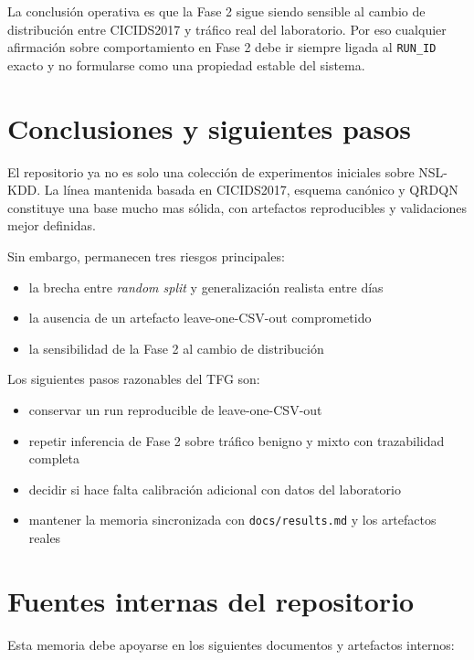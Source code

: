 \documentclass[12pt,a4paper]{report}
\begin{document}
La conclusión operativa es que la Fase 2 sigue siendo sensible al cambio de
distribución entre CICIDS2017 y tráfico real del laboratorio. Por eso cualquier
afirmación sobre comportamiento en Fase 2 debe ir siempre ligada al \texttt{RUN\_ID}
exacto y no formularse como una propiedad estable del sistema.

\chapter{Conclusiones y siguientes pasos}

El repositorio ya no es solo una colección de experimentos iniciales sobre NSL-KDD.
La línea mantenida basada en CICIDS2017, esquema canónico y QRDQN constituye una
base mucho mas sólida, con artefactos reproducibles y validaciones mejor definidas.

Sin embargo, permanecen tres riesgos principales:

\begin{itemize}
    \item la brecha entre \emph{random split} y generalización realista entre días
    \item la ausencia de un artefacto leave-one-CSV-out comprometido
    \item la sensibilidad de la Fase 2 al cambio de distribución
\end{itemize}

Los siguientes pasos razonables del TFG son:

\begin{itemize}
    \item conservar un run reproducible de leave-one-CSV-out
    \item repetir inferencia de Fase 2 sobre tráfico benigno y mixto con trazabilidad completa
    \item decidir si hace falta calibración adicional con datos del laboratorio
    \item mantener la memoria sincronizada con \texttt{docs/results.md} y los artefactos reales
\end{itemize}

\chapter{Fuentes internas del repositorio}

Esta memoria debe apoyarse en los siguientes documentos y artefactos internos:
\end{document}
